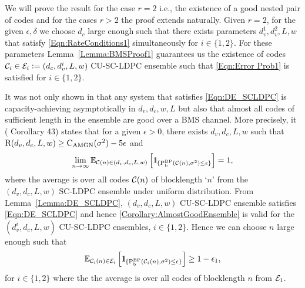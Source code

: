\documentclass[journal,draftcls,onecolumn,12pt,twoside]{IEEEtran}
\begin{document}
\begin{IEEEproof}
We will prove the result for the case $r=2$ i.e., the existence of a good nested pair of codes and for the cases $r>2$ the  proof extends naturally. Given $r=2$, for the given $\epsilon,\delta$ we choose $d_{c}$ large enough such that there exists parameters $d_{v}^{1},d_{v}^{2},L,w$ that satisfy \eqref{Eqn:RateConditions1} simultaneously for $i \in\{1,2\}$. For these parameters Lemma~\ref{Lemma:BMSProof1} guarantees us the existence of codes $\mathcal{C}_{i}\in\mathcal{E}_{i}\mathrel{\mathop:}= (d_{c},d_{v}^{i},L,w)$ CU-SC-LDPC ensemble such that \eqref{Eqn:Error Prob1} is satisfied for $i\in\{1,2\}$.

It was not only shown in \cite{kudekaruniversal} that any system that satisfies \eqref{Eqn:DE_SCLDPC} is capacity-achieving  asymptotically in $d_{v},d_{c},w,L$ but also that almost all codes of sufficient length in the ensemble are good over a BMS channel. More precisely, it (\cite{kudekaruniversal} Corollary 43) states that for a given $\epsilon >0$, there exists $d_{v},d_{c}, L,w$ such that $\text{R}(d_{v},d_{c},L,w)\geq \text{C}_{\text{AMGN}}(\sigma^{2})-5\epsilon$ and
\begin{align}
\lim_{n\rightarrow\infty}\mbb{E}_{\mc{C}(n)\in(d_{v},d_{c},L,w)}\left[ \ind_{\{\tx{P}_{\tx{b}}^{\tx{BP}}\left(\mc{C}(n),\sigma^{2}\right)\leq \epsilon\}}\right]=1,
\label{Corollary:AlmostGoodEnsemble}
\end{align}
where the average is over all codes $\mathcal{C}(n)$ of blocklength `$n$' from the $(d_{v},d_{c},L,w)$ SC-LDPC ensemble under uniform distribution. From Lemma~\ref{Lemma:DE_SCLDPC}, $(d_{v},d_{c},L,w)$ CU-SC-LDPC ensemble satisfies \eqref{Eqn:DE_SCLDPC} and hence \eqref{Corollary:AlmostGoodEnsemble} is valid for the $(d_{v}^{i},d_{c},L,w)$ CU-SC-LDPC ensembles, $i\in\{1,2\}$. Hence we can choose $n$ large enough such that 
\begin{align}
\mbb{E}_{\mc{C}_{i}(n)\in \mc{E}_{i}}\left[	 \ind_{\{\tx{P}_{\tx{b}}^{\tx{BP}}\left(\mc{C}_{i}(n),\sigma^{2}\right)\leq \epsilon\}}\right]\geq 1-\epsilon_{1},
\label{Eqn:Proof1.1}
\end{align}
for $i\in \{1,2\}$ where  the the average is over all codes of blocklength $n$ from $\mathcal{E}_{1}$.


\end{IEEEproof}
\end{document}
